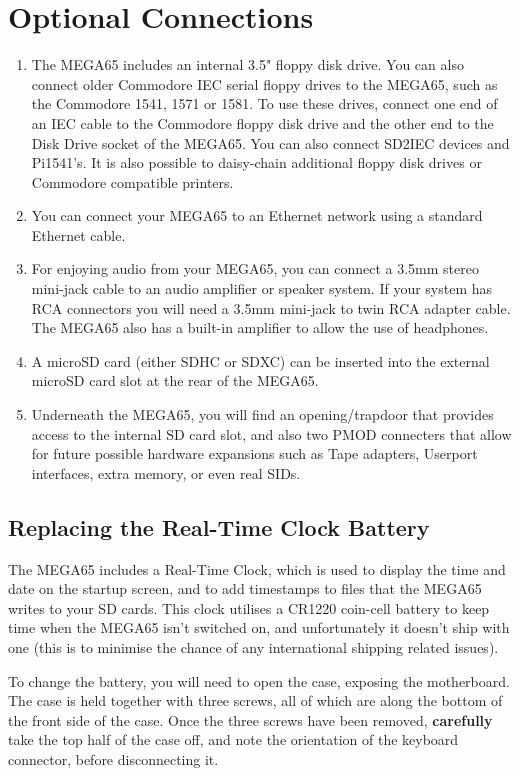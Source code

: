 \section{Optional Connections}
\begin{enumerate}
	\item The MEGA65 includes an internal 3.5" floppy disk drive. You can also connect older Commodore{\textregistered} IEC serial floppy drives to the MEGA65, such as the Commodore 1541, 1571 or 1581. To use these drives, connect one end of an IEC cable to the Commodore floppy disk drive and the other end to the Disk Drive socket of the MEGA65. You can also connect SD2IEC devices and Pi1541's. It is also possible to daisy-chain additional floppy disk drives or Commodore compatible printers.
	\item You can connect your MEGA65 to an Ethernet network using a standard Ethernet cable.
	\item For enjoying audio from your MEGA65, you can connect a 3.5mm stereo mini-jack cable to an audio amplifier or speaker system. If your system has RCA connectors you will need a 3.5mm mini-jack to twin RCA adapter cable. The MEGA65 also has a built-in amplifier to allow the use of headphones.
	\item A microSD card (either SDHC or SDXC) can be inserted into the external microSD card slot at the rear of the MEGA65.
    \item Underneath the MEGA65, you will find an opening/trapdoor that provides access to the internal SD card slot, and also two PMOD connecters that allow for future possible hardware expansions such as Tape adapters, Userport interfaces, extra memory, or even real SIDs.
\end{enumerate}

\subsection{Replacing the Real-Time Clock Battery}
The MEGA65 includes a Real-Time Clock, which is used to display the time and date on the startup screen, and to add
timestamps to files that the MEGA65 writes to your SD cards. This clock utilises a CR1220 coin-cell battery to keep
time when the MEGA65 isn't switched on, and unfortunately it doesn't ship with one (this is to minimise the chance
of any international shipping related issues).

To change the battery, you will need to open the case, exposing the motherboard. The case is held together with three
screws, all of which are along the bottom of the front side of the case. Once the three screws have been removed,
{\bf carefully} take the top half of the case off, and note the orientation of the keyboard connector, before
disconnecting it.

